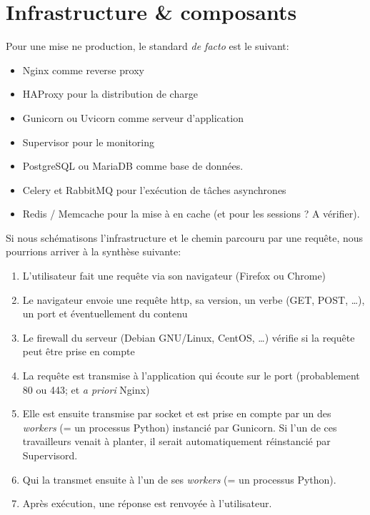 \documentclass[11pt]{amsbook}
\begin{document}
\hypertarget{x-infrastructure-&-composants}{\chapter{Infrastructure \& composants}}
Pour une mise ne production, le standard \emph{de facto} est le suivant:


\begin{itemize}

\item Nginx comme reverse proxy

\item HAProxy pour la distribution de charge

\item Gunicorn ou Uvicorn comme serveur d’application

\item Supervisor pour le monitoring

\item PostgreSQL ou MariaDB comme base de données.

\item Celery et RabbitMQ pour l’exécution de tâches asynchrones

\item Redis / Memcache pour la mise à en cache (et pour les sessions ? A vérifier).

\end{itemize}


Si nous schématisons l’infrastructure et le chemin parcouru par une requête, nous pourrions arriver à la synthèse suivante:


\begin{enumerate}

\item{L’utilisateur fait une requête via son navigateur (Firefox ou Chrome)}

\item{Le navigateur envoie une requête http, sa version, un verbe (GET, POST, …​), un port et éventuellement du contenu}

\item{Le firewall du serveur (Debian GNU/Linux, CentOS, …​) vérifie si la requête peut être prise en compte}

\item{La requête est transmise à l’application qui écoute sur le port (probablement 80 ou 443; et \emph{a priori} Nginx)}

\item{Elle est ensuite transmise par socket et est prise en compte par un des \emph{workers} (= un processus Python) instancié par Gunicorn. Si l’un de ces travailleurs venait à planter, il serait automatiquement réinstancié par Supervisord.}

\item{Qui la transmet ensuite à l’un de ses \emph{workers} (= un processus Python).}

\item{Après exécution, une réponse est renvoyée à l’utilisateur.}

\end{enumerate}
\end{document}
